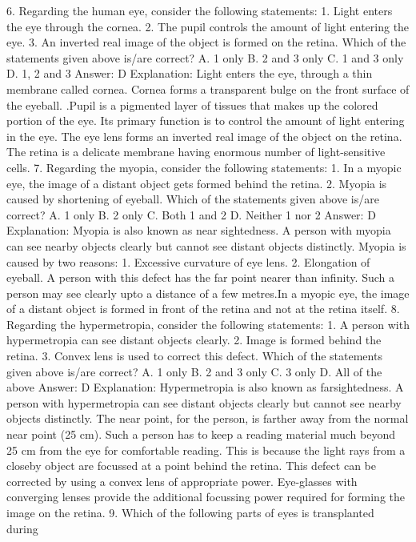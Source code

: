 6. Regarding the human eye, consider the following statements:
1. Light enters the eye through the cornea.
2. The pupil controls the amount of light entering the eye.
3. An inverted real image of the object is formed on the retina.
Which of the statements given above is/are correct?
A. 1 only
B. 2 and 3 only
C. 1 and 3 only
D. 1, 2 and 3
Answer: D
Explanation: Light enters the eye, through a thin membrane called
cornea. Cornea forms a transparent bulge on the front surface of
the eyeball. .Pupil is a pigmented layer of tissues that makes up the
colored portion of the eye. Its primary function is to control the
amount of light entering in the eye. The eye lens forms an inverted
real image of the object on the retina. The retina is a delicate
membrane having enormous number of light-sensitive cells.
7. Regarding the myopia, consider the following statements:
1. In a myopic eye, the image of a distant object gets formed behind
the retina.
2. Myopia is caused by shortening of eyeball.
Which of the statements given above is/are correct?
A. 1 only
B. 2 only
C. Both 1 and 2
D. Neither 1 nor 2
Answer: D
Explanation: Myopia is also known as near sightedness. A person
with myopia can see nearby objects clearly but cannot see distant
objects distinctly.
Myopia is caused by two reasons:
1. Excessive curvature of eye lens.
2. Elongation of eyeball.
A person with this defect has the far point nearer than infinity.
Such a person may see clearly upto a distance of a few metres.In a
myopic eye, the image of a distant object is formed in front of the
retina and not at the retina itself.
8. Regarding the hypermetropia, consider the following
statements:
1. A person with hypermetropia can see distant objects clearly.
2. Image is formed behind the retina.
3. Convex lens is used to correct this defect.
Which of the statements given above is/are correct?
A. 1 only
B. 2 and 3 only
C. 3 only
D. All of the above
Answer: D
Explanation: Hypermetropia is also known as farsightedness. A
person with hypermetropia can see distant objects clearly but
cannot see nearby objects distinctly.
The near point, for the person, is farther away from the normal near
point (25 cm). Such a person has to keep a reading material much
beyond 25 cm from the eye for comfortable reading. This is because
the light rays from a closeby object are focussed at a point behind
the retina. This defect can be corrected by using a convex lens of
appropriate power. Eye-glasses with converging lenses provide the
additional focussing power required for forming the image on the
retina.
9. Which of the following parts of eyes is transplanted during
